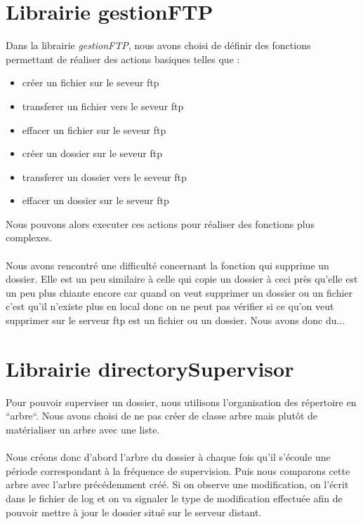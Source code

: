 \section{Librairie gestionFTP}

Dans la librairie \textit{gestionFTP}, nous avons choisi de définir des fonctions permettant de réaliser des actions basiques telles que : 
\begin{itemize}
\item créer un fichier sur le seveur ftp
\item transferer un fichier vers le seveur ftp
\item effacer un fichier sur le seveur ftp
\item créer un dossier sur le seveur ftp
\item transferer un dossier vers le seveur ftp
\item effacer un dossier sur le seveur ftp
\end{itemize}

Nous pouvons alors executer ces actions pour réaliser des fonctions plus complexes.\\
\\
Nous avons rencontré une difficulté concernant la fonction qui supprime un dossier. 
Elle est un peu similaire à celle qui copie un dossier à ceci près qu'elle est un peu plus chiante encore car quand 
on veut supprimer un dossier ou un fichier c'est qu'il n'existe plus en local donc on ne peut pas vérifier si ce 
qu'on veut supprimer sur le serveur ftp est un fichier ou un dossier. Nous avons donc du...


\section{Librairie directorySupervisor}

Pour pouvoir superviser un dossier, nous utilisons l'organisation des répertoire en ``arbre``.
Nous avons choisi de ne pas créer de classe arbre mais plutôt de matérialiser un arbre avec une liste.\\
\\
Nous créons donc d'abord l'arbre du dossier à chaque fois qu'il s'écoule une période correspondant à la fréquence de supervision. 
Puis nous comparons cette arbre avec l'arbre précédemment créé. 
Si on observe une modification, on l'écrit dans le fichier de log et on va signaler le type de modification effectuée afin de pouvoir mettre à jour le dossier situé sur le serveur distant.\\
\\




